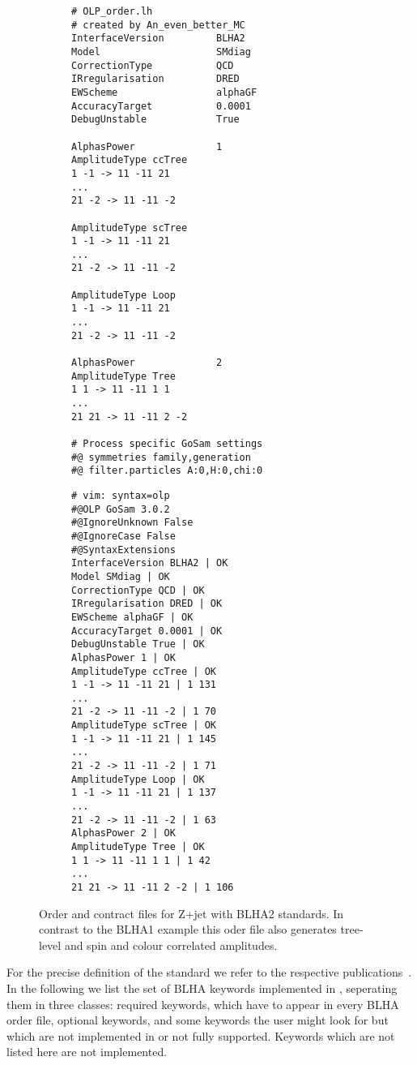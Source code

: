 \begin{figure}
\centering
\begin{subfigure}[]{0.49\textwidth}
\centering
\begin{lstlisting}[title={BLHA2 order file},gobble=0,style=insmall,keepspaces=true,frame=single]
# OLP_order.lh
# created by An_even_better_MC
InterfaceVersion         BLHA2
Model                    SMdiag
CorrectionType           QCD
IRregularisation         DRED
EWScheme                 alphaGF
AccuracyTarget           0.0001
DebugUnstable            True

AlphasPower              1
AmplitudeType ccTree
1 -1 -> 11 -11 21
...
21 -2 -> 11 -11 -2

AmplitudeType scTree
1 -1 -> 11 -11 21
...
21 -2 -> 11 -11 -2

AmplitudeType Loop
1 -1 -> 11 -11 21
...
21 -2 -> 11 -11 -2

AlphasPower              2
AmplitudeType Tree
1 1 -> 11 -11 1 1
...
21 21 -> 11 -11 2 -2

# Process specific GoSam settings
#@ symmetries family,generation
#@ filter.particles A:0,H:0,chi:0
\end{lstlisting}
\end{subfigure}
\hspace*{5pt}
\begin{subfigure}[]{0.46\textwidth}
\centering
\begin{lstlisting}[title={BLHA2 contract file},gobble=0,style=insmall,keepspaces=true,frame=single]
# vim: syntax=olp
#@OLP GoSam 3.0.2
#@IgnoreUnknown False
#@IgnoreCase False
#@SyntaxExtensions
InterfaceVersion BLHA2 | OK
Model SMdiag | OK
CorrectionType QCD | OK
IRregularisation DRED | OK
EWScheme alphaGF | OK
AccuracyTarget 0.0001 | OK
DebugUnstable True | OK
AlphasPower 1 | OK
AmplitudeType ccTree | OK
1 -1 -> 11 -11 21 | 1 131
...
21 -2 -> 11 -11 -2 | 1 70
AmplitudeType scTree | OK
1 -1 -> 11 -11 21 | 1 145
...
21 -2 -> 11 -11 -2 | 1 71
AmplitudeType Loop | OK
1 -1 -> 11 -11 21 | 1 137
...
21 -2 -> 11 -11 -2 | 1 63
AlphasPower 2 | OK
AmplitudeType Tree | OK
1 1 -> 11 -11 1 1 | 1 42
...
21 21 -> 11 -11 2 -2 | 1 106
\end{lstlisting}
\end{subfigure}
\caption{Order and contract files for Z+jet with BLHA2 standards. In contrast to the BLHA1 example this oder file also generates tree-level and spin and colour correlated amplitudes.}
\label{fig:BLHA2}
\end{figure}  

For the precise definition of the standard we refer to the respective publications~\cite{Binoth:2010xt,Alioli:2013nda}. In the following we list the set of BLHA keywords implemented in \gosam, seperating them in three classes: required keywords, which have to appear in every BLHA order file, optional keywords, and some keywords the user might look for but which are not implemented in \gosam or not fully supported. Keywords which are not listed here are not implemented.


